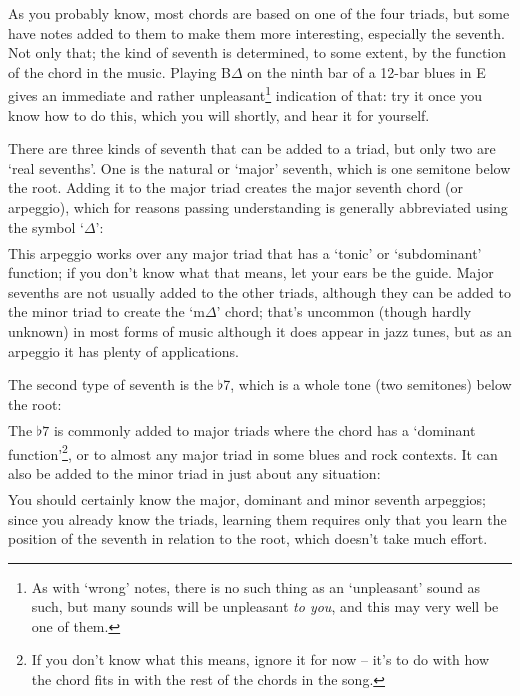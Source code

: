 \documentclass[english]{./gbook}
\begin{document}
\begin{large}
As you probably know, most chords are based on one of the four triads, but some have notes added to them to make them more interesting, especially the seventh. Not only that; the kind of seventh is determined, to some extent, by the function of the chord in the music. Playing B$\Delta$ on the ninth bar of a 12-bar blues in E gives an immediate and rather unpleasant\footnote{As with `wrong' notes, there is no such thing as an `unpleasant' sound as such, but many sounds will be unpleasant \emph{to you}, and this may very well be one of them.} indication of that: try it once you know how to do this, which you will shortly, and hear it for yourself.

There are three kinds of seventh that can be added to a triad, but only two are `real sevenths'. One is the natural or `major' seventh, which is one semitone below the root. Adding it to the major triad creates the major seventh chord (or arpeggio), which for reasons passing understanding is generally abbreviated using the symbol `$\Delta$':
\[
\begin{array}{ccccc}
	&%
	&%
	&%
	&%
\end{array}
\]
This arpeggio works over any major triad that has a `tonic' or `subdominant' function; if you don't know what that means, let your ears be the guide. Major sevenths are not usually added to the other triads, although they can be added to the minor triad to create the `m$\Delta$' chord; that's uncommon (though hardly unknown) in most forms of music although it does appear in jazz tunes, but as an arpeggio it has plenty of applications.

The second type of seventh is the $\flat$7, which is a whole tone (two semitones) below the root:
\[
\begin{array}{ccccc}
	&%
	&%
	&%
	&%
\end{array}
\]
The $\flat7$ is commonly added to major triads where the chord has a `dominant function'\footnote{If you don't know what this means, ignore it for now -- it's to do with how the chord fits in with the rest of the chords in the song.}, or to almost any major triad in some blues and rock contexts. It can also be added to the minor triad in just about any situation:
\[
\begin{array}{ccccc}
	&%
	&%
	&%
	&%
\end{array}
\]
You should certainly know the major, dominant and minor seventh arpeggios; since you already know the triads, learning them requires only that you learn the position of the seventh in relation to the root, which doesn't take much effort.


\end{large}
\end{document}
